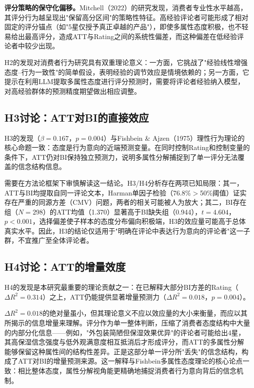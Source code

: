 \textbf{评分策略的保守化偏移。}Mitchell（2022）\cite{mitchell2022}的研究发现，消费者专业性水平越高，其评分行为越呈现出"保留高分区间"的策略性特征。高经验评论者可能形成了相对固定的评分锚点（如"5星仅授予真正卓越的产品"），即使多属性态度积极，也不轻易给出最高评分，造成ATT与Rating之间的系统性偏差，而这种偏差在低经验评论者中较少出现。

H2的发现对消费者行为研究具有双重理论意义：一方面，它挑战了"经验线性增强态度--行为一致性"的简单假设，表明经验的调节效应是情境依赖的；另一方面，它提示在利用LLM提取多属性态度进行评分预测时，需要将评论者经验纳入模型，对高经验群体的预测精度期望做出相应调整。

\subsection{H3讨论：ATT对BI的直接效应}

H3的发现（$\beta=0.167$，$p=0.004$）与Fishbein \& Ajzen（1975）\cite{fishbein1975}理性行为理论的核心命题一致：态度是行为意向的近端预测变量。在同时控制Rating和控制变量的条件下，ATT仍对BI保持独立预测力，说明多属性分解捕捉到了单一评分无法覆盖的信念结构信息。

需要在方法论框架下审慎解读这一结论。H3/H4分析存在两项已知局限：其一，ATT与BI均提取自同一评论文本，Harman单因子检验（76.8\%$>$50\%阈值）证实存在严重的同源方差（CMV）问题，两者的相关可能被人为放大；其二，BI存在组（$N=298$）的ATT均值（1.370）显著高于BI缺失组（0.944），$t=4.604$，$p<0.001$，选择偏差使子样本的态度分布偏向积极端，H3的效应量可能高于总体真实水平。因此，H3的结论仅适用于"明确在评论中表达行为意向的评论者"这一子群，不宜推广至全体评论者。

\subsection{H4讨论：ATT的增量效度}

H4的发现是本研究最重要的理论贡献之一：在已解释大部分BI方差的Rating（$\Delta R^2=0.314$）之上，ATT仍能提供显著增量预测力（$\Delta R^2=0.018$，$p=0.004$）。

$\Delta R^2=0.018$的绝对量虽小，但其理论意义不应以效应量的大小来衡量，而应以其所揭示的信息增量来理解。评分作为单一整体判断，压缩了消费者态度结构中大量的内部分化信息——例如，"外包装简陋但保湿效果优异"的评论者可能给出4星，其高保湿信念强度与低外观满意度相互抵消后才形成评分，而ATT的多属性分解能够保留这种属性间的结构性差异。正是这部分单一评分所"丢失"的信念结构，构成了ATT对BI的增量预测来源。这一解释与Fishbein多属性态度理论\cite{fishbein1975}的核心论点一致：相比整体态度，属性分解视角能更精确地捕捉消费者行为意向背后的信念机制。


